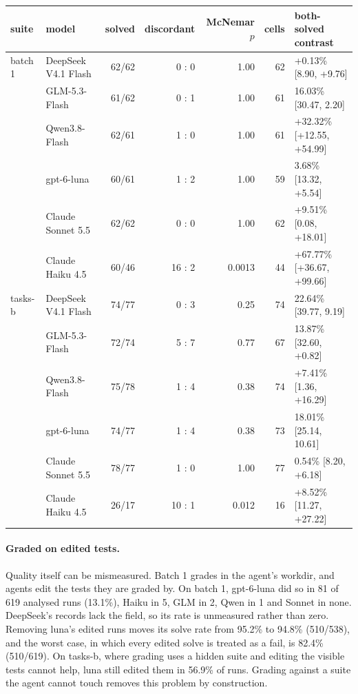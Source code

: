 \documentclass[10pt]{article}
\newcommand*{\mi}{\textminus}   %
\newenvironment{inlinetable}{\par\medskip\noindent\begin{minipage}{\linewidth}\centering\small}{\end{minipage}\par\bigskip}
\begin{document}
\begin{inlinetable}
\label{tab:quality}
\setlength{\tabcolsep}{4pt}
\begin{tabular}{@{}llrrrrl@{}}
\toprule
suite & model & solved & discordant & McNemar $p$ & cells & both-solved contrast \\
\midrule
batch 1 & DeepSeek V4.1 Flash & 62/62 & 0 : 0 & 1.00 & 62 & +0.13\% [\mi{}8.90, +9.76] \\
 & GLM-5.3-Flash & 61/62 & 0 : 1 & 1.00 & 61 & \mi{}16.03\% [\mi{}30.47, \mi{}2.20] \\
 & Qwen3.8-Flash & 62/61 & 1 : 0 & 1.00 & 61 & +32.32\% [+12.55, +54.99] \\
 & gpt-6-luna & 60/61 & 1 : 2 & 1.00 & 59 & \mi{}3.68\% [\mi{}13.32, +5.54] \\
 & Claude Sonnet 5.5 & 62/62 & 0 : 0 & 1.00 & 62 & +9.51\% [\mi{}0.08, +18.01] \\
 & Claude Haiku 4.5 & 60/46 & 16 : 2 & 0.0013 & 44 & +67.77\% [+36.67, +99.66] \\
\midrule
tasks-b & DeepSeek V4.1 Flash & 74/77 & 0 : 3 & 0.25 & 74 & \mi{}22.64\% [\mi{}39.77, \mi{}9.19] \\
 & GLM-5.3-Flash & 72/74 & 5 : 7 & 0.77 & 67 & \mi{}13.87\% [\mi{}32.60, +0.82] \\
 & Qwen3.8-Flash & 75/78 & 1 : 4 & 0.38 & 74 & +7.41\% [\mi{}1.36, +16.29] \\
 & gpt-6-luna & 74/77 & 1 : 4 & 0.38 & 73 & \mi{}18.01\% [\mi{}25.14, \mi{}10.61] \\
 & Claude Sonnet 5.5 & 78/77 & 1 : 0 & 1.00 & 77 & \mi{}0.54\% [\mi{}8.20, +6.18] \\
 & Claude Haiku 4.5 & 26/17 & 10 : 1 & 0.012 & 16 & +8.52\% [\mi{}11.27, +27.22] \\
\bottomrule
\end{tabular}
\end{inlinetable}

\paragraph{Graded on edited tests.} Quality itself can be mismeasured. Batch 1 grades in the agent's
workdir, and agents edit the tests they are graded by. On batch 1, gpt-6-luna did so in 81 of 619 analysed runs
(13.1\%), Haiku in 5, GLM in 2, Qwen in 1 and Sonnet in none. DeepSeek's records lack the field, so
its rate is unmeasured rather than zero. Removing luna's edited runs moves its solve rate from 95.2\%
to 94.8\% (510/538), and the worst case, in which every edited solve is treated as a fail, is 82.4\% (510/619). On
tasks-b, where grading uses a hidden suite and editing the visible tests cannot help, luna still
edited them in 56.9\% of runs. Grading against a suite the agent cannot touch removes this problem
by construction.
\end{document}
